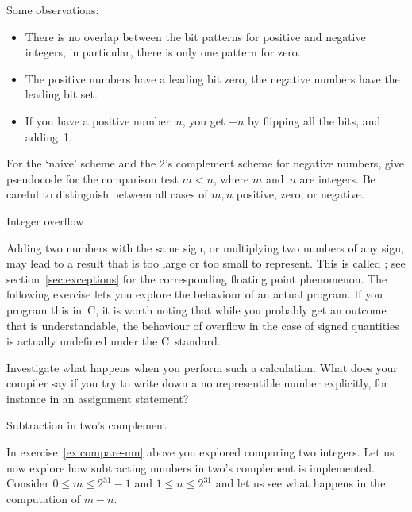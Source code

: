 Some observations:
\begin{itemize}
\item There is no overlap between the bit patterns for positive and
  negative integers, in particular, there is only one pattern for zero.
\item The positive numbers have a leading bit zero, the negative
  numbers have the leading bit set.
\item If you have a positive number~$n$, you get $-n$ by flipping
  all the bits, and adding~1.
\end{itemize}

\begin{exercise}
  \label{ex:compare-mn}
  For the `naive' scheme and the 2's complement scheme for negative
  numbers, give pseudocode for the comparison test $m<n$, where $m$
  and~$n$ are integers. Be careful to distinguish between all cases of
  $m,n$ positive, zero, or negative.
\end{exercise}

 {Integer overflow}

Adding two numbers with the same sign, or multiplying two numbers of
any sign, may lead to a result that is too
large or too small to represent. This is called ;
see section~\ref{sec:exceptions} for the corresponding floating
point phenomenon.
The following exercise lets you explore the behaviour of an actual
program. If you program this in~C, it is worth noting that while you
probably get an outcome that is understandable, the behaviour
of overflow in the case of signed quantities is
actually undefined under the C~standard.

\begin{exercise}
  \label{ex:int-overflow}
  Investigate what happens when you perform such a calculation. What
  does your compiler say if you try to write down a nonrepresentible
  number explicitly, for instance in an assignment statement?
\end{exercise}

 {Subtraction in two's complement}

In exercise~\ref{ex:compare-mn} above you explored comparing two integers.
Let us now explore how 
subtracting numbers in two's complement is implemented. Consider $0\leq
m\leq 2^{31}-1$ and $1\leq n\leq 2^{31}$ and let us see what happens
in the computation of $m-n$. 

